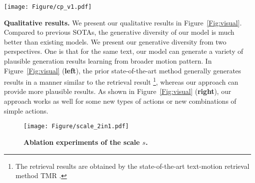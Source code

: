 \documentclass[letterpaper]{article} \usepackage{aaai24}
\begin{document}
\begin{figure*}[t] 
	\centering 
	\texttt{[image: Figure/cp\_v1.pdf]} 
	\caption{\textbf{Visual Comparison of the state-of-the-art methods} on text-to-motion generation. The colors from light to dark indicate the progression of time. MDD is presented in blue, the prior SOTA is presented in red, and the retrieval results of HumanML3D are presented in yellow. (\textbf{left}) demonstrates that our approach can produce more plausible results for a given prompt. (\textbf{right}) demonstrates some new motion patterns or combinations learned by our approach.}
	\label{Fig:visual} 
\end{figure*}


\noindent\textbf{Qualitative results.} We present our qualitative results in Figure~\ref{Fig:visual}. Compared to previous SOTAs, the generative diversity of our model is much better than existing models. We present our generative diversity from two perspectives. One is that for the same text, our model can generate a variety of plausible generation results learning from broader motion pattern. In Figure~\ref{Fig:visual} (\textbf{left}), the prior state-of-the-art method generally generates results in a manner similar to the retrieval result \footnote{The retrieval results are obtained by the state-of-the-art text-motion retrieval method TMR \cite{petrovich23tmr}.}, whereas our approach can provide more plausible results. As shown in Figure~\ref{Fig:visual} (\textbf{right}), our approach works as well for some new types of actions or new combinations of simple actions.





\begin{figure}[tb] 
	\centering 
        
	\texttt{[image: Figure/scale\_2in1.pdf]} 
	\caption{\textbf{Ablation experiments of the scale $s$.}} 
	\label{fig:scale} 
\end{figure} 
\end{document}
